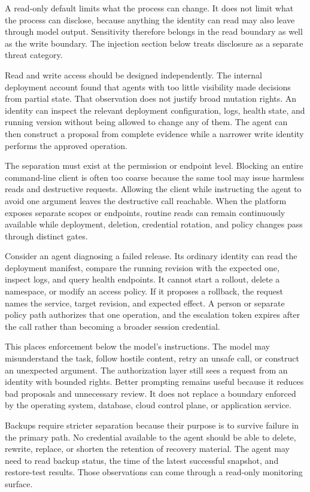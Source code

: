 A read-only default limits what the process can change. It does not limit what the process can disclose, because anything the identity can read may also leave through model output. Sensitivity therefore belongs in the read boundary as well as the write boundary. The injection section below treats disclosure as a separate threat category.

Read and write access should be designed independently. The internal deployment account found that agents with too little visibility made decisions from partial state. That observation does not justify broad mutation rights. An identity can inspect the relevant deployment configuration, logs, health state, and running version without being allowed to change any of them. The agent can then construct a proposal from complete evidence while a narrower write identity performs the approved operation.

The separation must exist at the permission or endpoint level. Blocking an entire command-line client is often too coarse because the same tool may issue harmless reads and destructive requests. Allowing the client while instructing the agent to avoid one argument leaves the destructive call reachable. When the platform exposes separate scopes or endpoints, routine reads can remain continuously available while deployment, deletion, credential rotation, and policy changes pass through distinct gates.

Consider an agent diagnosing a failed release. Its ordinary identity can read the deployment manifest, compare the running revision with the expected one, inspect logs, and query health endpoints. It cannot start a rollout, delete a namespace, or modify an access policy. If it proposes a rollback, the request names the service, target revision, and expected effect. A person or separate policy path authorizes that one operation, and the escalation token expires after the call rather than becoming a broader session credential.

This places enforcement below the model's instructions. The model may misunderstand the task, follow hostile content, retry an unsafe call, or construct an unexpected argument. The authorization layer still sees a request from an identity with bounded rights. Better prompting remains useful because it reduces bad proposals and unnecessary review. It does not replace a boundary enforced by the operating system, database, cloud control plane, or application service.

Backups require stricter separation because their purpose is to survive failure in the primary path. No credential available to the agent should be able to delete, rewrite, replace, or shorten the retention of recovery material. The agent may need to read backup status, the time of the latest successful snapshot, and restore-test results. Those observations can come through a read-only monitoring surface.

